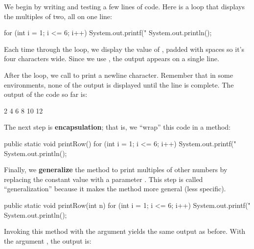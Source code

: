 We begin by writing and testing a few lines of code.
Here is a loop that displays the multiples of two, all on one line:

\begin{code}
for (int i = 1; i <= 6; i++) {
    System.out.printf("%
}
System.out.println();
\end{code}

%

Each time through the loop, we display the value of , padded with spaces so it's four characters wide.
Since we use , the output appears on a single line.

After the loop, we call  to print a newline character.
Remember that in some environments, none of the output is displayed until the line is complete.
The output of the code so far is:

\begin{stdout}
   2   4   6   8  10  12
\end{stdout}


The next step is {\bf encapsulation}; that is, we ``wrap'' this code in a method:

\begin{code}
public static void printRow() {
    for (int i = 1; i <= 6; i++) {
        System.out.printf("%
    }
    System.out.println();
}
\end{code}


Finally, we {\bf generalize} the method to print multiples of other numbers by replacing the constant value  with a parameter .
This step is called ``generalization'' because it makes the method more general (less specific).

\begin{code}
public static void printRow(int n) {
    for (int i = 1; i <= 6; i++) {
        System.out.printf("%
    }
    System.out.println();
}
\end{code}

Invoking this method with the argument  yields the same output as before.
With the argument , the output is:

